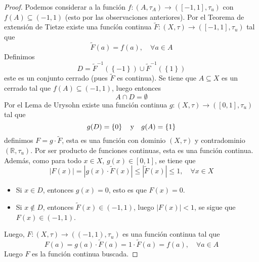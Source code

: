 \documentclass[12pt]{report}
\theoremstyle{largebreak}
\newcommand\abs[1]{\ensuremath{\left|#1\right|}}
\newcommand\cf[3]{\ensuremath{#1:#2\rightarrow#3}}
\begin{document}
    \begin{proof}
        Podemos considerar a la función $\cf{f}{(A,\tau_A)}{([-1,1],\tau_u)}$ con $f(A)\subseteq(-1,1)$ (esto por las observaciones anteriores). Por el Teorema de extensión de Tietze existe una funcíón continua $\cf{\widetilde{F}}{(X,\tau)}{([-1,1],\tau_u)}$ tal que
        \begin{equation*}
            \widetilde{F}(a)=f(a),\quad\forall a\in A
        \end{equation*}
        Definimos
        \begin{equation*}
            D=\widetilde{F}^{-1}(\left\{-1\right\})\cup \widetilde{F}^{-1}(\left\{1\right\})
        \end{equation*}
        este es un conjunto cerrado (pues $\widetilde{F}$ es continua). Se tiene que $A\subseteq X$ es un cerrado tal que $f(A)\subseteq(-1,1)$, luego entonces
        \begin{equation*}
            A\cap D=\emptyset
        \end{equation*}
        Por el Lema de Urysohn existe una función continua $\cf{g}{(X,\tau)}{([0,1],\tau_u)}$ tal que
        \begin{equation*}
            g(D)=\left\{0 \right\}\quad\textup{y}\quad g(A)=\left\{1 \right\}
        \end{equation*}
        definimos $F=g\cdot \widetilde{F}$, esta es una función con dominio $(X,\tau)$ y contradominio $(\mathbb{R},\tau_u)$. Por ser producto de funciones continuas, esta es una función continua. Además, como para todo $x\in X$, $g(x)\in[0,1]$, se tiene que
        \begin{equation*}
            \abs{F(x)}=\abs{g(x)\cdot \widetilde{F}(x)}\leq \abs{\widetilde{F}(x)}\leq 1,\quad\forall x\in X
        \end{equation*}
        \begin{itemize}
            \item Si $x\in D$, entonces $g(x)=0$, esto es que $F(x)=0$.
            \item Si $x\notin D$, entonces $\widetilde{F}(x)\in(-1,1)$, luego $\abs{F(x)}<1$, se sigue que $F(x)\in(-1,1)$.
        \end{itemize}
        Luego, $\cf{F}{(X,\tau)}{((-1,1),\tau_u)}$ es una función continua tal que
        \begin{equation*}
            F(a)=g(a)\cdot \widetilde{F}(a)=1\cdot \widetilde{F}(a)=f(a),\quad\forall a\in A
        \end{equation*}
        Luego $F$ es la función continua buscada.
    \end{proof}
\end{document}
